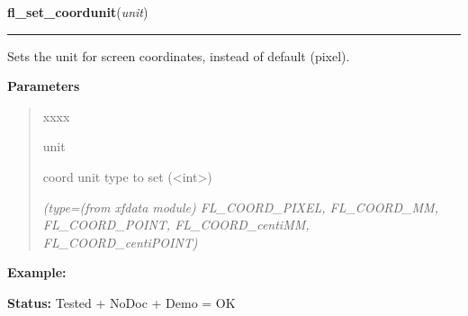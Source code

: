     \label{xformslib:library:fl_set_coordunit}

    \vspace{0.5ex}

\hspace{.8\funcindent}\begin{boxedminipage}{\funcwidth}

    \raggedright \textbf{fl\_set\_coordunit}(\textit{unit})

    \vspace{-1.5ex}

    \rule{\textwidth}{0.5\fboxrule}
\setlength{\parskip}{2ex}
    Sets the unit for screen coordinates, instead of default (pixel).

\setlength{\parskip}{1ex}
      \textbf{Parameters}
      \vspace{-1ex}

      \begin{quote}
        \begin{Ventry}{xxxx}

          \item[unit]

          coord unit type to set ({\textless}int{\textgreater})

            {\it (type=(from xfdata module) FL\_COORD\_PIXEL, FL\_COORD\_MM, FL\_COORD\_POINT, 
FL\_COORD\_centiMM, FL\_COORD\_centiPOINT)}

        \end{Ventry}

      \end{quote}

\textbf{Example:} 

\textbf{Status:} Tested + NoDoc + Demo = OK



    \end{boxedminipage}

    \label{xformslib:library:fl_set_border_width}

    \vspace{0.5ex}

